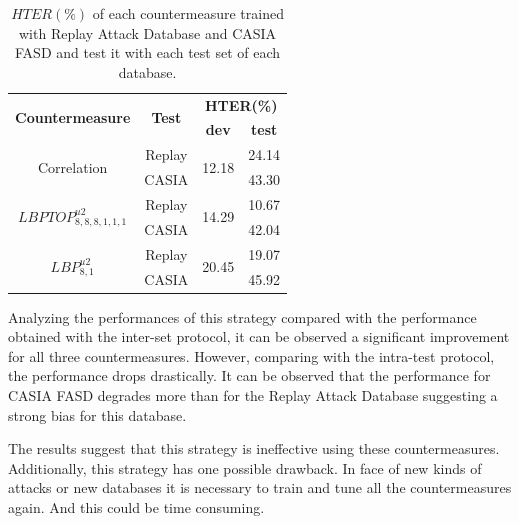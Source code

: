 \begin{table}[ht]
\caption{$HTER(\%)$  of each countermeasure trained with Replay Attack Database and CASIA FASD and test it with each test set of each database.}
\begin{center}
  \begin{tabular}{ | c | c | c  c |}
    \hline

   \multirow{2}{*}{\textbf{Countermeasure}} &  \multirow{2}{*}{\textbf{Test}} & \multicolumn{2}{c|}{\textbf{HTER(\%)}} \\ 
    &&\textbf{dev} & \textbf{test}  \\ \hline
    
    \multirow{2}{*}{Correlation} & Replay  &  \multirow{2}{*}{12.18} & 24.14 \\ 
               & CASIA &  & 43.30  \\ \hline \hline

    \multirow{2}{*}{$LBPTOP_{8,8,8,1,1,1}^{u2}$}  & Replay  & \multirow{2}{*}{14.29} & 10.67 \\
               &  CASIA  & & 42.04  \\ \hline \hline

    \multirow{2}{*}{$LBP_{8,1}^{u2}$}  & Replay  & \multirow{2}{*}{20.45} &19.07 \\
                & CASIA  &  & 45.92 \\
    \hline
  \end{tabular}
\end{center}
\label{tb:TrainAllTest}
\end{table}

Analyzing the performances of this strategy compared with the performance obtained with the inter-set protocol, it can be observed a significant improvement for all three countermeasures. However, comparing with the intra-test protocol, the performance drops drastically. It can be observed that the performance for CASIA FASD degrades more than for the Replay Attack Database suggesting a strong bias for this database. 

The results suggest that this strategy is ineffective using these countermeasures. Additionally, this strategy has one possible drawback. In face of new kinds of attacks or new databases it is necessary to train and tune all the countermeasures again. And this could be time consuming.




